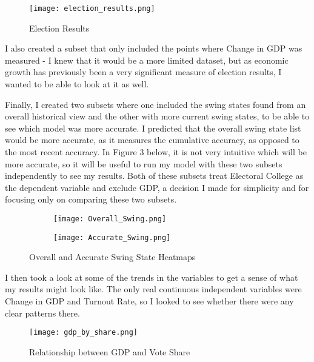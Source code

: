 \documentclass[12pt]{article}
\begin{document}
\begin{figure}[H]
    \centering
    \texttt{[image: election\_results.png]}
    \caption{Election Results}
\end{figure}

I also created a subset that only included the points where Change in GDP was measured - I knew that it would be a more limited dataset, but as economic growth has previously been a very significant measure of election results, I wanted to be able to look at it as well. 

\vspace{3.00mm}

Finally, I created two subsets where one included the swing states found from an overall historical view and the other with more current swing states, to be able to see which model was more accurate. I predicted that the overall swing state list would be more accurate, as it measures the cumulative accuracy, as opposed to the most recent accuracy. In Figure 3 below, it is not very intuitive which will be more accurate, so it will be useful to run my model with these two subsets independently to see my results. Both of these subsets treat Electoral College as the dependent variable and exclude GDP, a decision I made for simplicity and for focusing only on comparing these two subsets.

\begin{figure}[H]
    \begin{subfigure}
        \centering
        \texttt{[image: Overall\_Swing.png]}
    \end{subfigure}
    \begin{subfigure}
        \centering
        \texttt{[image: Accurate\_Swing.png]}
    \end{subfigure}
    \caption{Overall and Accurate Swing State Heatmaps}
\end{figure}

I then took a look at some of the trends in the variables to get a sense of what my results might look like. The only real continuous independent variables were Change in GDP and Turnout Rate, so I looked to see whether there were any clear patterns there.

\begin{figure}[H]
    \centering
    \texttt{[image: gdp\_by\_share.png]}
    \caption{Relationship between GDP and Vote Share}
\end{figure}
\end{document}
